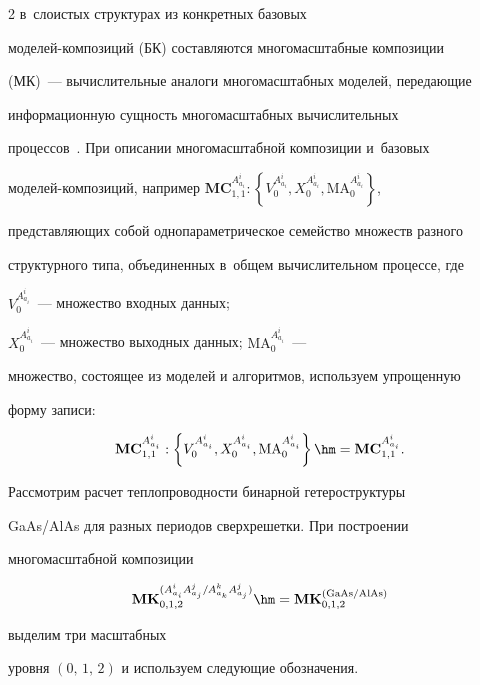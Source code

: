 \begin{multicols}{2}
    в~слоистых структурах из конкретных базовых  


мо\-де\-лей-ком\-по\-зи\-ций (БК) составляются многомасштабные композиции 


(МК)~--- вычислительные аналоги многомасштабных моделей, передающие 


информационную сущность многомасштабных вычислительных  


процессов~\cite{3-ab, 4-ab}. При описании многомасштабной композиции и~базовых  


мо\-де\-лей-ком\-по\-зи\-ций, например $\mathbf{MC}_{1,1}^{A^i_{a_i}}: 


\left\{ V_0^{A^i_{a_i}}, X_0^{A^i_{a_i}}, \mathrm{MA}_0^{A^i_{a_i}}\right\}$, 


представляющих собой однопараметрическое семейство множеств разного 


структурного типа, объединенных в~общем вы\-чис\-ли\-тель\-ном процессе, где 


$V_0^{A^i_{a_i}}$~--- множество входных данных; 


$X_0^{A^i_{a_i}}$~--- множество выходных данных; $\mathrm{MA}_0^{A^i_{a_i}}$~--- 


множество, состоящее из моделей и алгоритмов, используем упрощенную 


форму записи: 


    $$


    \mathbf{MC}_{1,1}^{A^i_{a_i}}: \left\{ V_0^{A^i_{a_i}}, 


X_0^{A^i_{a_i}}, \mathrm{MA}_0^{A^i_{a_i}}\right\}\hm= 


\mathbf{MC}_{1,1}^{A^i_{a_i}}.


$$


    


    Рассмотрим расчет теплопроводности бинарной гетероструктуры 


GaAs/AlAs для разных периодов сверхрешетки. При построении 


многомасштабной композиции 


$$


\mathbf{MK}_{0,1,2}^{(A^i_{a_i}A^j_{a_j}/A^k_{a_k}A^j_{a_j})}\hm= 


\mathbf{MK}_{0,1,2}^{(\mathrm{GaAs/AlAs})}


$$ 


выделим три масштабных 


уровня $(0,\,1,\,2)$ и используем следующие обозначения.






\end{multicols}
